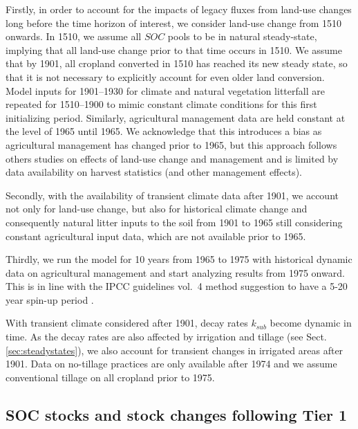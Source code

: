 \documentclass[gc, manuscript]{copernicus}
\begin{document}
Firstly, in order to account for the impacts of legacy fluxes from land-use changes long before the time horizon of interest, we consider land-use change from 1510 onwards. In 1510, we assume all \(SOC\) pools to be in natural steady-state, implying that all land-use change prior to that time occurs in 1510. We assume that by 1901, all cropland converted in 1510 has reached its new steady state, so that it is not necessary to explicitly account for even older land conversion. Model inputs for 1901--1930 for climate and natural vegetation litterfall are repeated for 1510--1900 to mimic constant climate conditions for this first initializing period. Similarly, agricultural management data are held constant at the level of 1965 until 1965.
We acknowledge that this introduces a bias as agricultural management has changed prior to 1965, but this approach follows others studies on effects of land-use change and management \citep[e.g.][]{schaphoff_lpjml4_2018-1, herzfeld_soc_2021} and is limited by data availability on harvest statistics (and other management effects).

Secondly, with the availability of transient climate data after 1901, we account not only for land-use change, but also for historical climate change and consequently natural litter inputs to the soil from 1901 to 1965 still considering constant agricultural input data, which are not available prior to 1965.

Thirdly, we run the model for 10 years from 1965 to 1975 with historical dynamic data on agricultural management and start analyzing results from 1975 onward. This is in line with the IPCC guidelines vol.~4 method suggestion to have a 5-20 year spin-up period \citep{ogle_cropland_in_ipcc_2019}.

With transient climate considered after 1901, decay rates \(k_{sub}\) become dynamic in time. As the decay rates are also affected by irrigation and tillage (see Sect. \ref{sec:steadystates}), we also account for transient changes in irrigated areas after 1901. Data on no-tillage practices are only available after 1974 and we assume conventional tillage on all cropland prior to 1975.

\hypertarget{sec:tier1}{%
\subsection{SOC stocks and stock changes following Tier 1}\label{sec:tier1}}
\end{document}
